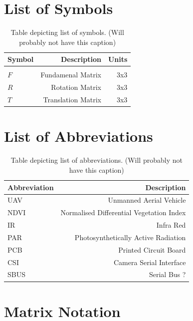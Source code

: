\cleardoublepage
\tableofcontents

\clearpage
\label{listoffigures}
\listoffigures

\clearpage
{}
\label{listoftables}
\listoftables

\chapter{List of Symbols}
\begin{table}[H]
\centering
\begin{tabular}{l|r|r}
Symbol & Description & Units\\\hline\\
$F$ & Fundamenal Matrix & 3x3\\
$R$ & Rotation Matrix & 3x3\\
$T$ & Translation Matrix & 3x3\\
\end{tabular}
\caption{\label{tab:symb}Table depicting list of symbols. (Will probably not have this caption)}
\end{table}

\chapter{List of Abbreviations}
\begin{table}[H]
\centering
\begin{tabular}{l|r}
Abbreviation & Description \\\hline
UAV & Unmanned Aerial Vehicle \\
NDVI & Normalised Differential Vegetation Index\\
IR & Infra Red\\
PAR & Photosynthetically Active Radiation\\
PCB & Printed Circuit Board\\
CSI & Camera Serial Interface\\
SBUS & Serial Bus ?\\
\end{tabular}
\caption{\label{tab:abbr}Table depicting list of abbreviations. (Will probably not have this caption)}
\end{table}

\chapter{Matrix Notation}

